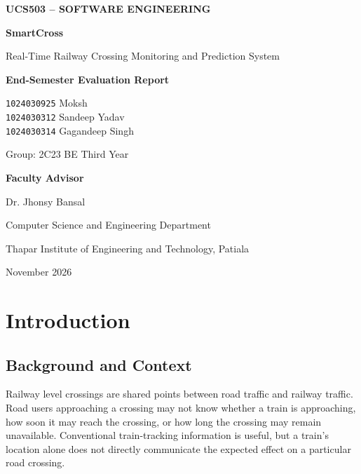 \documentclass[11pt,a4paper]{report}
\begin{document}
\begin{titlepage}
\centering
\vspace*{1.0cm}
{\Large\bfseries UCS503 -- SOFTWARE ENGINEERING\par}
\vspace{1.5cm}
{\Huge\bfseries SmartCross\par}
\vspace{0.35cm}
{\Large Real-Time Railway Crossing Monitoring and Prediction System\par}
\vspace{1.4cm}
{\large\bfseries End-Semester Evaluation Report\par}
\vspace{1.2cm}
{\large
\texttt{1024030925} Moksh\\[5pt]
\texttt{1024030312} Sandeep Yadav\\[5pt]
\texttt{1024030314} Gagandeep Singh\par}
\vspace{0.9cm}
{\large Group: 2C23 \quad BE Third Year\par}
\vspace{1.0cm}
{\large\bfseries Faculty Advisor\par}
{\large Dr. Jhonsy Bansal\par}
\vfill
{\large Computer Science and Engineering Department\par}
{\large Thapar Institute of Engineering and Technology, Patiala\par}
{\large November 2026\par}
\end{titlepage}

\tableofcontents
\listoffigures
\listoftables
\clearpage
{}

\chapter{Introduction}
\section{Background and Context}
Railway level crossings are shared points between road traffic and railway traffic. Road users approaching a crossing may not know whether a train is approaching, how soon it may reach the crossing, or how long the crossing may remain unavailable. Conventional train-tracking information is useful, but a train's location alone does not directly communicate the expected effect on a particular road crossing.
\end{document}
